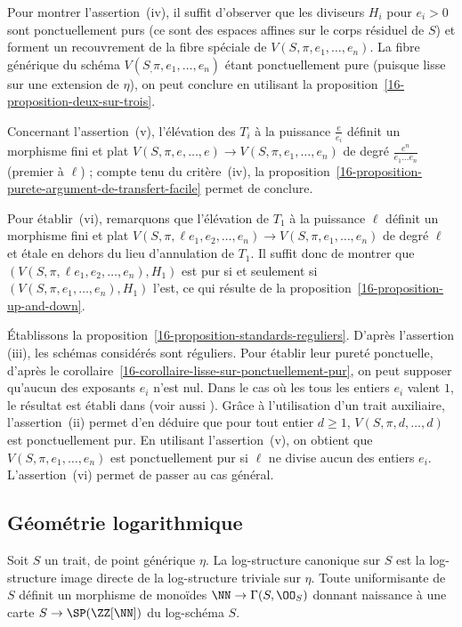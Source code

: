 \documentclass[10pt]{../fichiers-configuration-latex/smfart}
\begin{document}
Pour montrer l'assertion~(iv),
il suffit d'observer que les diviseurs $H_i$ pour
$e_i>0$ sont
ponctuellement purs (ce sont des espaces affines sur le corps résiduel de
$S$) et forment un recouvrement de la fibre spéciale de
$V(S,\pi,e_1,\dots,e_n)$. La fibre générique du schéma
$V(S_,\pi,e_1,\dots,e_n)$
étant ponctuellement pure (puisque lisse sur une extension
de $\eta$), on peut conclure en
utilisant la proposition~\ref{16-proposition-deux-sur-trois}.

Concernant l'assertion~(v),
l'élévation des $T_i$ à la puissance $\frac e
{e_i}$ définit un morphisme fini et plat $V(S,\pi,e,\dots,e)\to
V(S,\pi,e_1,\dots,e_n)$ de degré $\frac{e^n}{e_1\dots e_n}$ (premier à
$\ell$) ; compte tenu du critère~(iv), la
proposition~\ref{16-proposition-purete-argument-de-transfert-facile} permet de
conclure.

Pour établir~(vi), remarquons que l'élévation de $T_1$ à la puissance
$\ell$ définit un morphisme fini et plat 
$V(S,\pi,\ell e_1,e_2,\dots,e_n)\to V(S,\pi,e_1,\dots,e_n)$
de degré $\ell$ et étale en dehors du lieu d'annulation de $T_1$.
Il suffit
donc de montrer que $(V(S,\pi,\ell e_1,e_2,\dots,e_n),H_1)$
est pur si et seulement si
$(V(S,\pi,e_1,\dots,e_n),H_1)$ l'est, ce qui résulte
de la proposition~\ref{16-proposition-up-and-down}.

\medskip

Établissons la proposition~\ref{16-proposition-standards-reguliers}. D'après
l'assertion (iii), les schémas considérés sont réguliers. Pour établir leur
pureté ponctuelle, d'après
le corollaire~\ref{16-corollaire-lisse-sur-ponctuellement-pur}, on peut
supposer qu'aucun des exposants $e_i$ n'est nul. Dans le cas où les tous
les entiers $e_i$ valent $1$, le résultat est établi dans 
\cite[theorem~1.4]{DWORK@Illusie} (voir aussi
\cite[Satz~2.21]{UEBER@Rapoport-Zink}). Grâce à l'utilisation d'un trait auxiliaire,
l'assertion~(ii) permet d'en déduire
que pour tout entier $d\geq 1$, $V(S,\pi,d,\dots,d)$
est ponctuellement pur. En utilisant l'assertion~(v), on obtient que
$V(S,\pi,e_1,\dots,e_n)$ est ponctuellement pur si $\ell$ ne divise aucun
des entiers $e_i$. L'assertion~(vi) permet de passer au cas général.

\subsection{Géométrie logarithmique}%
\label{16-subsection-geometrie-logarithmique}

\begin{definition2}
Soit $S$ un trait, de point générique $\eta$. La log-structure canonique
sur $S$ est la log-structure image directe de la log-structure triviale sur
$\eta$. Toute uniformisante de $S$ définit un morphisme de monoïdes
$\NN\to\Gamma(S,\OO_S)$ donnant naissance à une carte 
$S\to \SP(\ZZ[\NN])$ du log-schéma $S$.
\end{definition2}
\end{document}
